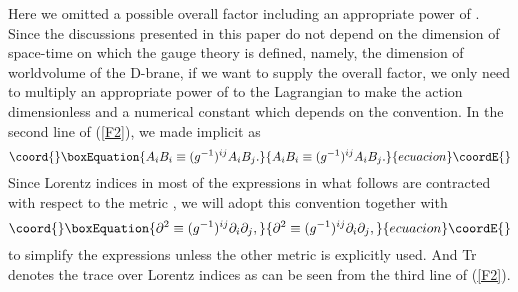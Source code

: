 \documentclass[a4paper,12pt]{article}
\begin{document}
Here we omitted a possible overall factor
including an appropriate power of \coordHE{}.
Since the discussions presented in this paper
do not depend on the dimension of space-time
on which the gauge theory is defined,
namely, the dimension of worldvolume of the D-brane,
if we want to supply the overall factor,
we only need to multiply an appropriate power of
\coordHE{} to the Lagrangian to make the action
dimensionless and a numerical constant
which depends on the convention.
In the second line of (\ref{F2}),
we made \coordHE{} implicit as
\begin{equation}\coord{}\boxEquation{
A_i B_i \equiv (g^{-1})^{ij} A_i B_j.
\label{implicit-g-1}
}{
A_i B_i \equiv (g^{-1})^{ij} A_i B_j.
}{ecuacion}\coordE{}\end{equation}
Since Lorentz indices in most of the expressions in what follows
are contracted with respect to the metric \coordHE{},
we will adopt this convention together with
\begin{equation}\coord{}\boxEquation{
\partial^2 \equiv (g^{-1})^{ij} \partial_i \partial_j,
\label{implicit-g-2}
}{
\partial^2 \equiv (g^{-1})^{ij} \partial_i \partial_j,
}{ecuacion}\coordE{}\end{equation}
to simplify the expressions
unless the other metric \coordHE{} is explicitly used.
And Tr denotes the trace over Lorentz indices
as can be seen from the third line of (\ref{F2}).
\end{document}
